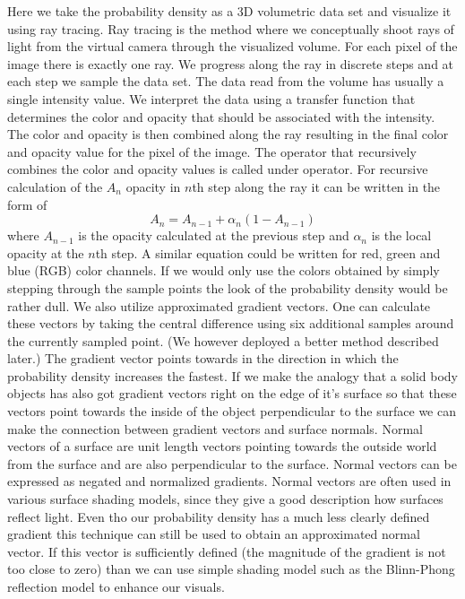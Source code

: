 Here we take the probability density as a 3D volumetric data set and visualize it using ray tracing.
Ray tracing is the method where we conceptually shoot rays of light from the virtual camera through the visualized volume.
For each pixel of the image there is exactly one ray.
We progress along the ray in discrete steps and at each step we sample the data set.
The data read from the volume has usually a single intensity value.
We interpret the data using a transfer function that determines the color and opacity that should be associated with the intensity.
The color and opacity is then combined along the ray resulting in the final color and opacity value for the pixel of the image.
The operator that recursively combines the color and opacity values is called under operator. For recursive calculation of the $A_n$ opacity in $n$th step along the ray it can be written in the form of
\begin{equation}
	\label{eq:under_op}
	A_n = A_{n-1} + \alpha_n(1 - A_{n-1})
\end{equation}
where $A_{n-1}$ is the opacity calculated at the previous step and $\alpha_n$ is the local opacity at the $n$th step.
A similar equation could be written for red, green and blue (RGB) color channels.
If we would only use the colors obtained by simply stepping through the sample points the look of the probability density would be rather dull.
We also utilize approximated gradient vectors.
One can calculate these vectors by taking the central difference using six additional samples around the currently sampled point.
(We however deployed a better method described later.)
The gradient vector points towards in the direction in which the probability density increases the fastest.
If we make the analogy that a solid body objects has also got gradient vectors right on the edge of it's surface so that these vectors point towards the inside of the object perpendicular to the surface
we can make the connection between gradient vectors and surface normals.
Normal vectors of a surface are unit length vectors pointing towards the outside world from the surface and are also perpendicular to the surface.
Normal vectors can be expressed as negated and normalized gradients.
Normal vectors are often used in various surface shading models, since they give a good description how surfaces reflect light.
Even tho our probability density has a much less clearly defined gradient this technique can still be used to obtain an approximated normal vector.
If this vector is sufficiently defined (the magnitude of the gradient is not too close to zero) than we can use simple shading model such as the Blinn-Phong reflection model \cite{Blinn1977} to enhance our visuals.
